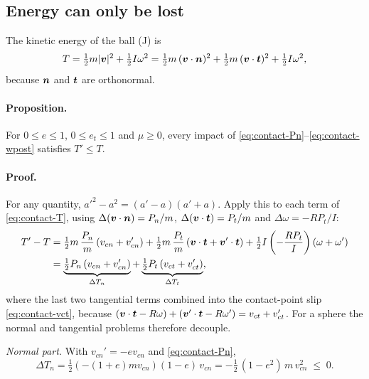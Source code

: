 \subsection{Energy can only be lost}
\label{sec:contact-energy}

The kinetic energy of the ball (\unit{J}) is
\begin{equation}
  T = \tfrac12 m|\bm{v}|^2 + \tfrac12 I\omega^2
    = \tfrac12 m\,(\bm{v}\cdot\bm{n})^2 + \tfrac12 m\,(\bm{v}\cdot\bm{t})^2 + \tfrac12 I\omega^2,
  \label{eq:contact-T}
\end{equation}
because $\bm{n}$ and $\bm{t}$ are orthonormal.

\paragraph{Proposition.}
For $0\le e\le 1$, $0\le e_t\le 1$ and $\mu\ge0$, every impact of \eqref{eq:contact-Pn}--\eqref{eq:contact-wpost}
satisfies $T'\le T$.

\paragraph{Proof.}
For any quantity, $a'^2-a^2=(a'-a)(a'+a)$. Apply this to each term of \eqref{eq:contact-T}, using
$\Delta(\bm{v}\cdot\bm{n})=P_n/m$, $\Delta(\bm{v}\cdot\bm{t})=P_t/m$ and
$\Delta\omega=-RP_t/I$:
\begin{align}
  T'-T
  &= \tfrac12 m\,\frac{P_n}{m}\left(v_{cn}+v_{cn}'\right)
   + \tfrac12 m\,\frac{P_t}{m}\left(\bm{v}\cdot\bm{t}+\bm{v}'\cdot\bm{t}\right)
   + \tfrac12 I\left(-\frac{RP_t}{I}\right)\left(\omega+\omega'\right) \nonumber\\
  &= \underbrace{\tfrac12 P_n\left(v_{cn}+v_{cn}'\right)}_{\Delta T_n}
   + \underbrace{\tfrac12 P_t\left(v_{ct}+v_{ct}'\right)}_{\Delta T_t},
  \label{eq:contact-dT-split}
\end{align}
where the last two tangential terms combined into the contact-point slip \eqref{eq:contact-vct},
because $(\bm{v}\cdot\bm{t}-R\omega)+(\bm{v}'\cdot\bm{t}-R\omega')=v_{ct}+v_{ct}'$. For a
sphere the normal and tangential problems therefore decouple.

\emph{Normal part.} With $v_{cn}'=-ev_{cn}$ and \eqref{eq:contact-Pn},
\begin{equation}
  \Delta T_n = \tfrac12\left(-(1+e)m v_{cn}\right)(1-e)\,v_{cn}
  = -\tfrac12\,(1-e^2)\,m\,v_{cn}^2 \;\le\; 0 .
  \label{eq:contact-dTn}
\end{equation}

